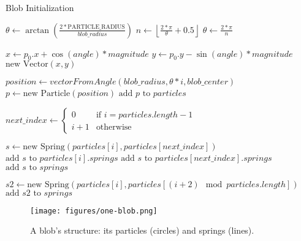 \documentclass[manuscript, screen]{timtm}
\begin{document}
\begin{algorithm}
\caption{Blob Initialization} \label{algo:init}
\begin{algorithmic}[1]
\State $\theta \gets \arctan\left(\frac{2 * \text{PARTICLE\_RADIUS}}{blob\_radius}\right)$
\State $n \gets \left\lfloor \frac{2 * \pi}{\theta} + 0.5 \right\rfloor$ 
\State $\theta \gets \frac{2 * \pi}{n}$ 

    \State $x \gets p_0.x + \cos(angle) * magnitude$
    \State $y \gets p_0.y - \sin(angle) * magnitude$
    \State \Return $\text{new Vector}(x, y)$
\EndFunction

    \State $position \gets vectorFromAngle(blob\_radius, \theta * i, blob\_center)$
    \State $p \gets \text{new Particle}(position)$
    \State $\text{add } p \text{ to } particles$ 
\EndFor

    \State $next\_index \gets \begin{cases}
    0 & \text{if } i = particles.length - 1 \\
    i + 1 & \text{otherwise}
    \end{cases}$
    
    \State $s \gets \text{new Spring}(particles[i], particles[next\_index])$
    \State $\text{add } s \text{ to } particles[i].springs$ 
    \State $\text{add } s \text{ to } particles[next\_index].springs$  
    \State $\text{add } s \text{ to } springs$ 
    
    \State $s2 \gets \text{new Spring}(particles[i], particles[(i + 2) \mod particles.length])$
    \State $\text{add } s2 \text{ to } springs$ 
\EndFor

\end{algorithmic}
\end{algorithm}

\begin{figure}[h]
  \centering
  \texttt{[image: figures/one-blob.png]}
  \caption{A blob's structure: its particles (circles) and springs (lines).}
  \label{fig:one-blob}
\end{figure}
\end{document}
